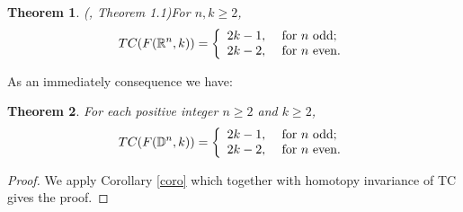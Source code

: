 \documentclass{amsart}
\newtheorem{thm}{Theorem}[section]
\theoremstyle{definition}
\numberwithin{equation}{section}
\begin{document}
\begin{thm}(\cite{farber2009topological}, Theorem 1.1)\label{theor-F-G}
For $n,k\geq 2$,
\begin{equation}
  TC(F(\mathbb{R}^n,k))=\left\{ \begin{array}{ll}
                                                           2k-1, & \hbox{ for $n$ odd;} \\
                                                           2k-2, & \hbox{ for $n$ even.}
                                                         \end{array}
                                                       \right.
  \end{equation}
\end{thm}

As an immediately consequence we have: 
 
\begin{thm}\label{tc-dn}
  For each positive integer $n\geq 2$ and $k\geq 2$,
  \begin{equation}
  TC(F(\mathbb{D}^n,k))=\left\{ \begin{array}{ll}
                                                           2k-1, & \hbox{ for $n$ odd;} \\
                                                           2k-2, & \hbox{ for $n$ even.}
                                                         \end{array}
                                                       \right.
  \end{equation}
\end{thm}
\begin{proof}
We apply Corollary \ref{coro} which together with homotopy invariance of TC gives the proof.
\end{proof}
\end{document}
